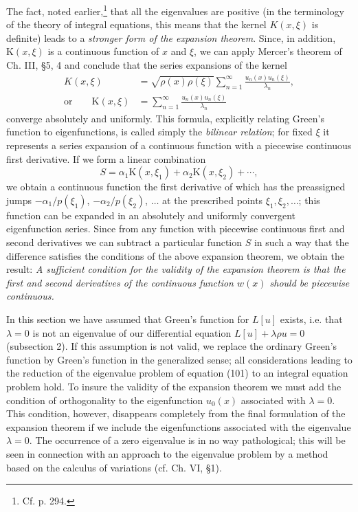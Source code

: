 The fact, noted earlier,\footnote{Cf. p. 294.} that all the eigenvalues are positive (in the terminology of the theory of integral equations, this means that the kernel $K(x,\xi)$ is definite) leads to a \emph{stronger form of the expansion theorem}. Since, in addition, $\mathrm K(x,\xi)$ is a continuous function of $x$ and $\xi$, we can apply Mercer's theorem of Ch. III, \S5, 4 and conclude that the series expansions of the kernel
\begin{equation}
\begin{aligned}
K(x,\xi)&=\sqrt{\rho(x)\rho(\xi)}\sum_{n=1}^{\infty}\frac{u_n(x)u_n(\xi)}{\lambda_n},\\
\text{or}\qquad \mathrm K(x,\xi)&=\sum_{n=1}^{\infty}\frac{u_n(x)u_n(\xi)}{\lambda_n}
\end{aligned}
\tag{103}
\end{equation}
converge absolutely and uniformly. This formula, explicitly relating Green's function to eigenfunctions, is called simply the \emph{bilinear relation}; for fixed $\xi$ it represents a series expansion of a continuous function with a piecewise continuous first derivative. If we form a linear combination
\[
S=\alpha_1\mathrm K(x,\xi_1)+\alpha_2\mathrm K(x,\xi_2)+\cdots,
\]
we obtain a continuous function the first derivative of which has the preassigned jumps $-\alpha_1/p(\xi_1)$, $-\alpha_2/p(\xi_2)$, $\ldots$ at the prescribed points $\xi_1,\xi_2,\ldots$; this function can be expanded in an absolutely and uniformly convergent eigenfunction series. Since from any function with piecewise continuous first and second derivatives we can subtract a particular function $S$ in such a way that the difference satisfies the conditions of the above expansion theorem, we obtain the result: \emph{A sufficient condition for the validity of the expansion theorem is that the first and second derivatives of the continuous function $w(x)$ should be piecewise continuous.}

In this section we have assumed that Green's function for $L[u]$ exists, i.e. that $\lambda=0$ is not an eigenvalue of our differential equation $L[u]+\lambda\rho u=0$ (subsection 2). If this assumption is not valid, we replace the ordinary Green's function by Green's function in the generalized sense; all considerations leading to the reduction of the eigenvalue problem of equation (101) to an integral equation problem hold. To insure the validity of the expansion theorem we must add the condition of orthogonality to the eigenfunction $u_0(x)$ associated with $\lambda=0$. This condition, however, disappears completely from the final formulation of the expansion theorem if we include the eigenfunctions associated with the eigenvalue $\lambda=0$. The occurrence of a zero eigenvalue is in no way pathological; this will be seen in connection with an approach to the eigenvalue problem by a method based on the calculus of variations (cf. Ch. VI, \S1).

